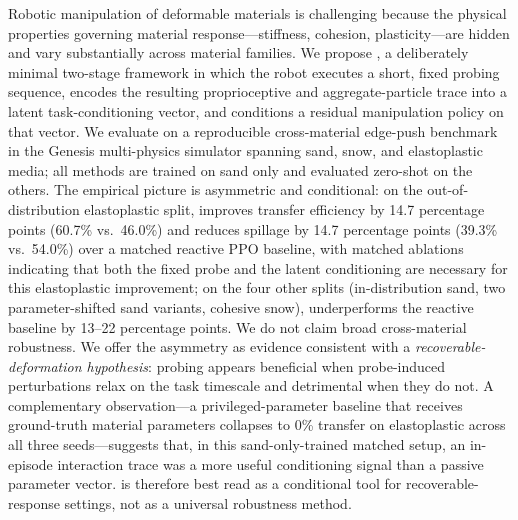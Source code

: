 Robotic manipulation of deformable materials is challenging because the physical properties governing material response---stiffness, cohesion, plasticity---are hidden and vary substantially across material families. We propose \PTA{}, a deliberately minimal two-stage framework in which the robot executes a short, fixed probing sequence, encodes the resulting proprioceptive and aggregate-particle trace into a latent task-conditioning vector, and conditions a residual manipulation policy on that vector. We evaluate \PTA{} on a reproducible cross-material edge-push benchmark in the Genesis multi-physics simulator spanning sand, snow, and elastoplastic media; all methods are trained on sand only and evaluated zero-shot on the others. The empirical picture is asymmetric and conditional: on the out-of-distribution elastoplastic split, \PTA{} improves transfer efficiency by 14.7 percentage points (60.7\% vs.\ 46.0\%) and reduces spillage by 14.7 percentage points (39.3\% vs.\ 54.0\%) over a matched reactive PPO baseline, with matched ablations indicating that both the fixed probe and the latent conditioning are necessary for this elastoplastic improvement; on the four other splits (in-distribution sand, two parameter-shifted sand variants, cohesive snow), \PTA{} underperforms the reactive baseline by 13--22 percentage points. We do not claim broad cross-material robustness. We offer the asymmetry as evidence consistent with a \emph{recoverable-deformation hypothesis}: probing appears beneficial when probe-induced perturbations relax on the task timescale and detrimental when they do not. A complementary observation---a privileged-parameter baseline that receives ground-truth material parameters collapses to 0\% transfer on elastoplastic across all three seeds---suggests that, in this sand-only-trained matched setup, an in-episode interaction trace was a more useful conditioning signal than a passive parameter vector. \PTA{} is therefore best read as a conditional tool for recoverable-response settings, not as a universal robustness method.
